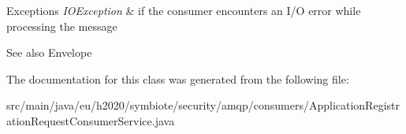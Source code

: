 \begin{DoxyExceptions}{Exceptions}
{\em I\+O\+Exception} & if the consumer encounters an I/O error while processing the message \\
\hline
\end{DoxyExceptions}
\begin{DoxySeeAlso}{See also}
Envelope 
\end{DoxySeeAlso}


The documentation for this class was generated from the following file\+:\begin{DoxyCompactItemize}
\item 
src/main/java/eu/h2020/symbiote/security/amqp/consumers/Application\+Registration\+Request\+Consumer\+Service.\+java\end{DoxyCompactItemize}
